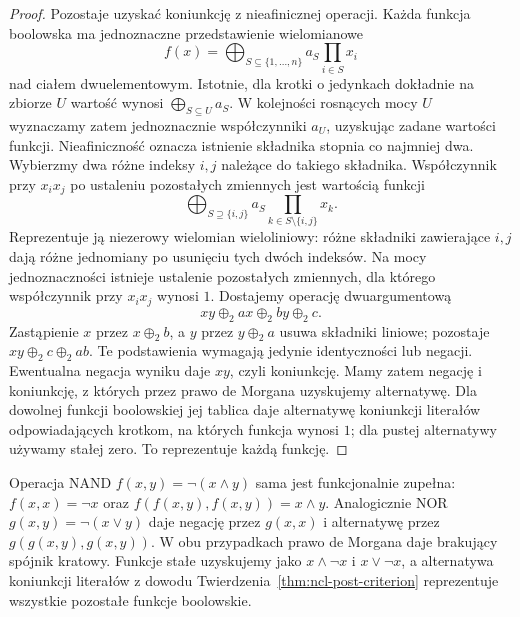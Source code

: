 \begin{proof}
Pozostaje uzyskać koniunkcję z nieafinicznej operacji.
Każda funkcja boolowska ma jednoznaczne przedstawienie
wielomianowe
\[
 f(x)=\bigoplus_{S\subseteq\{1,\ldots,n\}}
       a_S\prod_{i\in S}x_i
\]
nad ciałem dwuelementowym. Istotnie, dla krotki
o jedynkach dokładnie na zbiorze $U$ wartość wynosi
$\bigoplus_{S\subseteq U}a_S$. W kolejności rosnących
mocy $U$ wyznaczamy zatem jednoznacznie współczynniki
$a_U$, uzyskując zadane wartości funkcji.
Nieafiniczność oznacza istnienie składnika stopnia
co najmniej dwa. Wybierzmy dwa różne indeksy $i,j$
należące do takiego składnika. Współczynnik przy $x_i x_j$ po ustaleniu
pozostałych zmiennych jest wartością funkcji
\[
 \bigoplus_{S\supseteq\{i,j\}}
    a_S\prod_{k\in S\setminus\{i,j\}}x_k.
\]
Reprezentuje ją niezerowy wielomian wieloliniowy: różne składniki
zawierające $i,j$ dają różne jednomiany po usunięciu
tych dwóch indeksów. Na mocy jednoznaczności istnieje
ustalenie pozostałych zmiennych, dla którego
współczynnik przy $x_i x_j$ wynosi $1$.
Dostajemy operację dwuargumentową
\[
 xy\oplus_2 ax\oplus_2 by\oplus_2 c.
\]
Zastąpienie $x$ przez $x\oplus_2 b$, a $y$ przez
$y\oplus_2 a$ usuwa składniki liniowe; pozostaje
$xy\oplus_2 c\oplus_2 ab$. Te podstawienia wymagają
jedynie identyczności lub negacji. Ewentualna negacja
wyniku daje $xy$, czyli koniunkcję.
Mamy zatem negację i koniunkcję, z których przez
prawo de Morgana uzyskujemy alternatywę.
Dla dowolnej funkcji boolowskiej jej tablica daje
alternatywę koniunkcji literałów odpowiadających
krotkom, na których funkcja wynosi $1$;
dla pustej alternatywy używamy stałej zero.
To reprezentuje każdą funkcję.
\end{proof}

\begin{przyklad}\label{ex:ncl-nand-nor}
Operacja NAND $f(x,y)=\neg(x\wedge y)$ sama
jest funkcjonalnie zupełna:
$f(x,x)=\neg x$ oraz $f(f(x,y),f(x,y))=x\wedge y$.
Analogicznie NOR $g(x,y)=\neg(x\vee y)$ daje negację
przez $g(x,x)$ i alternatywę przez $g(g(x,y),g(x,y))$.
W obu przypadkach prawo de Morgana daje brakujący
spójnik kratowy. Funkcje stałe uzyskujemy jako
$x\wedge\neg x$ i $x\vee\neg x$, a alternatywa
koniunkcji literałów z dowodu
Twierdzenia~\ref{thm:ncl-post-criterion}
reprezentuje wszystkie pozostałe funkcje boolowskie.
\end{przyklad}

